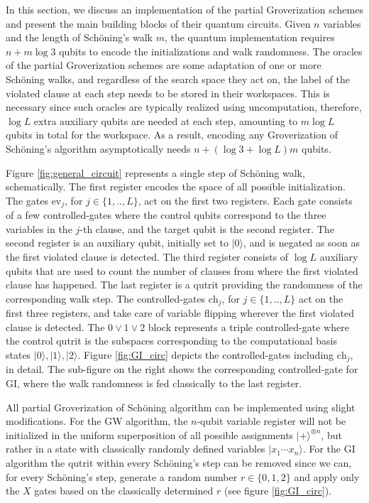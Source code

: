\documentclass[a4paper,aps,floatfix]{revtex4}
\newcommand{\ket}[1]{\mbox{$| #1 \rangle$}}
\begin{document}
In this section, we discuss an implementation of the partial Groverization schemes and present the main building blocks of their quantum circuits. Given $n$ variables and the length of Sch\"oning's walk $m$, the quantum implementation requires $n + m \log3$ qubits to encode the initializations and walk randomness. 
The oracles of the partial Groverization schemes are some adaptation of one or more Sch\"oning walks, and regardless of the search space they act on, the label of the violated clause at each step needs to be stored in their workspaces. This is necessary since such oracles are typically realized using uncomputation, therefore, $\log L$ extra auxiliary qubits are needed at each step, amounting to $m\log L$ qubits in total for the workspace. As a result, encoding any Groverization of Sch\"oning's algorithm asymptotically needs $n+(\log3+\log L)m$ qubits. 

Figure \ref{fig:general_circuit} represents a single step of Sch\"oning walk, schematically. The first register encodes the space of all possible initialization. The gates $\text{ev}_j$, for $j \in\{1,..,L\}$, act on the first two registers. Each gate consists of a few controlled-gates where the control qubits correspond to the three variables in the $j$-th clause, and the target qubit is the second register. The second register is an auxiliary qubit, initially set to $\ket{0}$, and is negated as soon as the first violated clause is detected. The third register consists of $\log L$ auxiliary qubits that are used to count the number of clauses from where the first violated clause has happened. The last register is a qutrit providing the randomness of the corresponding walk step. The controlled-gates $\text{ch}_j$, for $j \in\{1,..,L\}$ act on the first three registers, and take care of variable flipping wherever the first violated clause is detected. The $0\lor1\lor2$ block represents a triple controlled-gate where the control qutrit is the subspaces corresponding to the computational basis states $\ket{0},\ket{1},\ket{2}$. 
Figure \ref{fig:GI_circ} depicts the controlled-gates including $\text{ch}_j$, in detail. The sub-figure on the right shows the corresponding controlled-gate for GI, where the walk randomness is fed classically to the last register.  


All partial Groverization of Sch\"oning algorithm can be implemented using slight modifications.
For the GW algorithm, the $n$-qubit variable register will not be initialized in the uniform superposition of all possible assignments $\ket{+}^{\otimes n}$, but rather in a state with classically randomly defined variables $\ket{x_1 \cdots x_n}$.
For the GI algorithm the qutrit within every Sch\"oning's step can be removed since we can, for every Sch\"oning's step, generate a random number $r\in\{0, 1, 2\}$ and apply only the $X$ gates based on the classically determined $r$ (see figure \ref{fig:GI_circ}).
\end{document}
